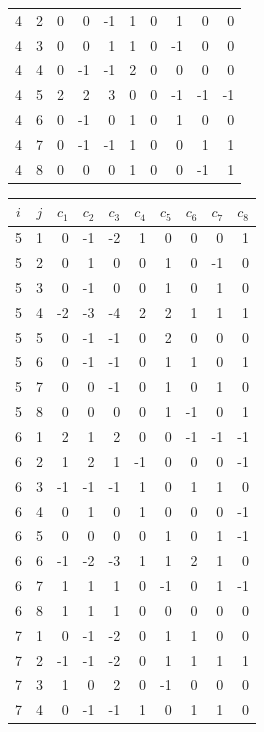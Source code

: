 \documentclass[twoside,english]{paper}
\numberwithin{equation}{section}
\numberwithin{figure}{section}
\theoremstyle{definition}
\theoremstyle{remark}
\begin{document}
\begin{table}[H]
\begin{minipage}[t]{0.48\textwidth}
\begin{tabular}{cc|rrrrrrrr}
4 & 2 & 0 & 0 & -1 & 1 & 0 & 1 & 0 & 0 \\
4 & 3 & 0 & 0 & 1 & 1 & 0 & -1 & 0 & 0 \\
4 & 4 & 0 & -1 & -1 & 2 & 0 & 0 & 0 & 0 \\
4 & 5 & 2 & 2 & 3 & 0 & 0 & -1 & -1 & -1 \\
4 & 6 & 0 & -1 & 0 & 1 & 0 & 1 & 0 & 0 \\
4 & 7 & 0 & -1 & -1 & 1 & 0 & 0 & 1 & 1 \\
4 & 8 & 0 & 0 & 0 & 1 & 0 & 0 & -1 & 1 \\
\bottomrule
\end{tabular}
\end{minipage}\hfill
\begin{minipage}[t]{0.48\textwidth}
\centering
\begin{tabular}{cc|rrrrrrrr}
\toprule
$i$ & $j$ & $c_1$ & $c_2$ & $c_3$ & $c_4$ & $c_5$ & $c_6$ & $c_7$ & $c_8$ \\
\midrule
5 & 1 & 0 & -1 & -2 & 1 & 0 & 0 & 0 & 1 \\
5 & 2 & 0 & 1 & 0 & 0 & 1 & 0 & -1 & 0 \\
5 & 3 & 0 & -1 & 0 & 0 & 1 & 0 & 1 & 0 \\
5 & 4 & -2 & -3 & -4 & 2 & 2 & 1 & 1 & 1 \\
5 & 5 & 0 & -1 & -1 & 0 & 2 & 0 & 0 & 0 \\
5 & 6 & 0 & -1 & -1 & 0 & 1 & 1 & 0 & 1 \\
5 & 7 & 0 & 0 & -1 & 0 & 1 & 0 & 1 & 0 \\
5 & 8 & 0 & 0 & 0 & 0 & 1 & -1 & 0 & 1 \\
\midrule
6 & 1 & 2 & 1 & 2 & 0 & 0 & -1 & -1 & -1 \\
6 & 2 & 1 & 2 & 1 & -1 & 0 & 0 & 0 & -1 \\
6 & 3 & -1 & -1 & -1 & 1 & 0 & 1 & 1 & 0 \\
6 & 4 & 0 & 1 & 0 & 1 & 0 & 0 & 0 & -1 \\
6 & 5 & 0 & 0 & 0 & 0 & 1 & 0 & 1 & -1 \\
6 & 6 & -1 & -2 & -3 & 1 & 1 & 2 & 1 & 0 \\
6 & 7 & 1 & 1 & 1 & 0 & -1 & 0 & 1 & -1 \\
6 & 8 & 1 & 1 & 1 & 0 & 0 & 0 & 0 & 0 \\
\midrule
7 & 1 & 0 & -1 & -2 & 0 & 1 & 1 & 0 & 0 \\
7 & 2 & -1 & -1 & -2 & 0 & 1 & 1 & 1 & 1 \\
7 & 3 & 1 & 0 & 2 & 0 & -1 & 0 & 0 & 0 \\
7 & 4 & 0 & -1 & -1 & 1 & 0 & 1 & 1 & 0 \\

\end{tabular}
\end{minipage}
\end{table}
\end{document}

